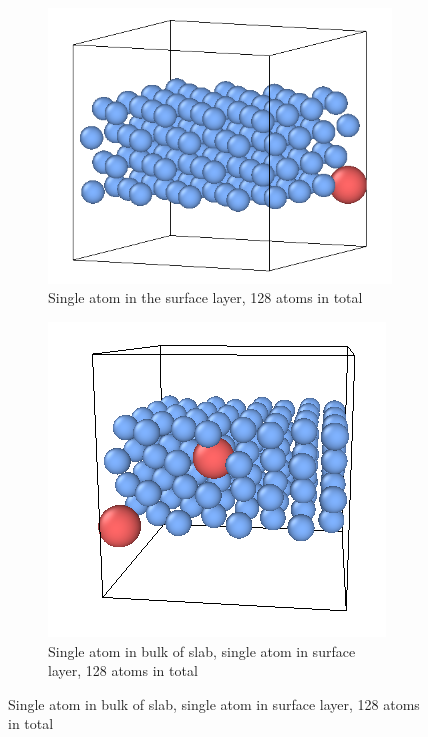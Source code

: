 \begin{figure}[htb]
\begin{subfigure}{.32\textwidth}
  \centering
  \includegraphics[width=.94\linewidth]{chapters/potentials_fe_pd_ru/slabs/slab01.png}  
  \caption{Single atom in the surface layer, 128 atoms in total}
  \label{fig:sub-first}
\end{subfigure}
\begin{subfigure}{.32\textwidth}
  \centering
  \includegraphics[width=.94\linewidth]{chapters/potentials_fe_pd_ru/slabs/slab02.png}  
  \caption{Single atom in bulk of slab, single atom in surface layer, 128 atoms in total}

\end{subfigure}
\end{figure}

